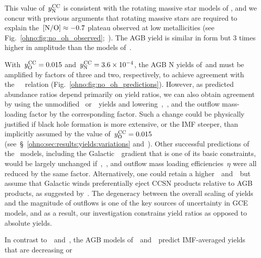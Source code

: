 This value of~$y_\text{N}^\text{CC}$ is consistent with the rotating massive star models of
\mbox{\citet{Limongi2018}}, and we concur with previous arguments that rotating
massive
stars are required to explain the~$\text{[N/O]} \approx -0.7$ plateau observed at low
metallicities (see Fig.~\ref{ohno:fig:no_oh_observed};~\citealp{Chiappini2003,
Chiappini2005, Chiappini2006, Kobayashi2011, Prantzos2018, Grisoni2021}).
The AGB yield is similar in form but 3 times higher in amplitude than the
models of~\cristallo.
\par
With~$y_\text{O}^\text{CC} = 0.015$ and~$y_\text{N}^\text{CC} = 3.6\times10^{-4}$, the AGB N yields
of~\cristallo\space and \space \ventura \space must be amplified by factors of
three and two,
respectively, to achieve agreement with
the~\mbox{\citet{Dopita2016}}~\ohno~relation (Fig.~\ref{ohno:fig:no_oh_predictions}).
However, as predicted abundance ratios depend primarily on yield ratios, we can
also obtain agreement by using the
unmodified
\cristallo~or~\ventura~yields and
lowering~,~, and the
outflow mass-loading factor by the corresponding factor.
Such a change could be physically justified if black hole formation is more
extensive, or the IMF steeper, than implicitly assumed by the value
of~$y_\text{O}^\text{CC} = 0.015$ (see~\S~\ref{ohno:sec:results:yields:variations}
and~\mbox{\citealp{Griffith2021b}}).
Other successful predictions of the~\mbox{\citet{Johnson2021}} models,
including the
Galactic~\oh~gradient that is one of its basic constraints, would be largely
unchanged if~,~, and outflow mass loading efficiencies~$\eta$
were all reduced by the same factor.
Alternatively, one could retain a higher~~and~~but assume that
Galactic winds preferentially eject CCSN products relative to AGB products, as
suggested by~\mbox{\citet{Vincenzo2016a}}.
The degeneracy between the overall scaling of yields and the magnitude of
outflows is one of the key sources of uncertainty in GCE models,
and as a result, our investigation constrains yield ratios as opposed to
absolute yields.
\par
In contrast to~\cristallo~and~\ventura, the AGB models
of~\karakasten~and~\karakas~predict IMF-averaged yields that are decreasing or
